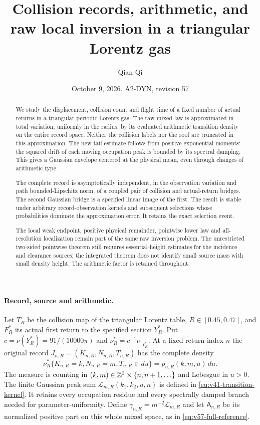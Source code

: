 \documentclass[11pt,reqno]{amsart}
\title[Collision records and raw local inversion]{Collision records, arithmetic, and raw local inversion in a triangular Lorentz gas}
\author{Qian Qi}
\date{October 9, 2026. A2-DYN, revision 57}
\numberwithin{equation}{section}
\theoremstyle{definition}\newtheorem{definition}[theorem]{Definition}
\theoremstyle{remark}\newtheorem{remark}[theorem]{Remark}
\begin{document}
\raggedbottom
\begin{abstract}
We study the displacement, collision count and flight time of a fixed
number of actual returns in a triangular periodic Lorentz gas. The raw
mixed law is approximated in total variation, uniformly in the radius,
by its evaluated arithmetic transition density on the entire record
space. Neither the collision labels nor the roof are truncated in this
approximation. The new tail estimate follows from positive exponential
moments: the squared drift of each moving occupation peak is bounded
by its spectral damping. This gives a Gaussian envelope centered at
the physical mean, even through changes of arithmetic type.

The complete record is asymptotically independent, in the observation
variation and path bounded-Lipschitz norm, of a coupled pair of collision
and actual-return bridges. The second Gaussian bridge is a specified
linear image of the first. The result is stable under arbitrary
record-observation kernels and subsequent selections whose probabilities
dominate the approximation error. It retains the exact selection event.

The local weak endpoint, positive physical remainder, pointwise lower
law and all-resolution localization remain part of the same raw
inversion problem. The unrestricted two-sided pointwise theorem still
requires essential-height estimates for the incidence and clearance
sources; the integrated theorem does not identify small source mass
with small density height. The arithmetic factor is retained throughout.
\end{abstract}
\maketitle

\paragraph{Record, source and arithmetic.}
Let $T_R$ be the collision map of the triangular Lorentz table,
$R\in[0.45,0.47]$, and $F_R^*$ its actual first return to the specified
section $Y_R^*$. Put $c=\nu(Y_R^*)=91/(10000\pi)$ and
$\nu_R^*=c^{-1}\nu|_{Y_R^*}$. At a fixed return index $n$ the original
record $J_{n,R}=(K_{n,R},N_{n,R},T_{n,R})$ has the complete density
\[
 \nu_R^*\{K_{n,R}=k,N_{n,R}=m,T_{n,R}\in du\}
                       =p_{n,R}(k,m,u)\,du.
\]
The measure is counting in $(k,m)\in\mathbb Z^2\times\{n,n+1,\ldots\}$
and Lebesgue in $u>0$. The finite Gaussian peak sum
$\mathcal L_{m,R}(k_1,k_2,u,n)$ is defined in
\eqref{eq:v41-transition-kernel}. It retains every occupation residue
and every spectrally damped branch needed for parameter-uniformity.
Define $\gamma_{n,R}=m^{-2}\mathcal L_{m,R}$ and let
$\mathsf A_{n,R}$ be its normalized positive part on this whole mixed
space, as in \eqref{eq:v57-full-reference}.
\end{document}
